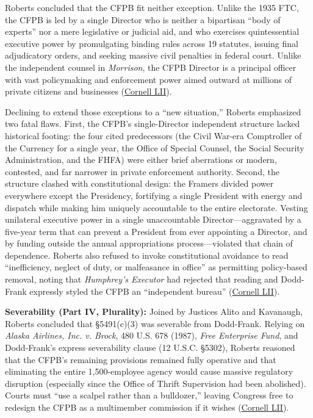 \documentclass[12pt]{article}
\begin{document}
Roberts concluded that the CFPB fit neither exception. Unlike the 1935 FTC, the CFPB is led by a single Director who is neither a bipartisan ``body of experts'' nor a mere legislative or judicial aid, and who exercises quintessential executive power by promulgating binding rules across 19 statutes, issuing final adjudicatory orders, and seeking massive civil penalties in federal court. Unlike the independent counsel in \textit{Morrison}, the CFPB Director is a principal officer with vast policymaking and enforcement power aimed outward at millions of private citizens and businesses (\href{https://www.law.cornell.edu/supremecourt/text/19-7}{Cornell LII}).

Declining to extend those exceptions to a ``new situation,'' Roberts emphasized two fatal flaws. First, the CFPB's single-Director independent structure lacked historical footing: the four cited predecessors (the Civil War-era Comptroller of the Currency for a single year, the Office of Special Counsel, the Social Security Administration, and the FHFA) were either brief aberrations or modern, contested, and far narrower in private enforcement authority. Second, the structure clashed with constitutional design: the Framers divided power everywhere except the Presidency, fortifying a single President with energy and dispatch while making him uniquely accountable to the entire electorate. Vesting unilateral executive power in a single unaccountable Director---aggravated by a five-year term that can prevent a President from ever appointing a Director, and by funding outside the annual appropriations process---violated that chain of dependence. Roberts also refused to invoke constitutional avoidance to read ``inefficiency, neglect of duty, or malfeasance in office'' as permitting policy-based removal, noting that \textit{Humphrey's Executor} had rejected that reading and Dodd-Frank expressly styled the CFPB an ``independent bureau'' (\href{https://www.law.cornell.edu/supremecourt/text/19-7}{Cornell LII}).

\textbf{Severability (Part IV, Plurality):} Joined by Justices Alito and Kavanaugh, Roberts concluded that \S 5491(c)(3) was severable from Dodd-Frank. Relying on \textit{Alaska Airlines, Inc. v. Brock}, 480 U.S. 678 (1987), \textit{Free Enterprise Fund}, and Dodd-Frank's express severability clause (12 U.S.C. \S 5302), Roberts reasoned that the CFPB's remaining provisions remained fully operative and that eliminating the entire 1,500-employee agency would cause massive regulatory disruption (especially since the Office of Thrift Supervision had been abolished). Courts must ``use a scalpel rather than a bulldozer,'' leaving Congress free to redesign the CFPB as a multimember commission if it wishes (\href{https://www.law.cornell.edu/supremecourt/text/19-7}{Cornell LII}).
\end{document}
